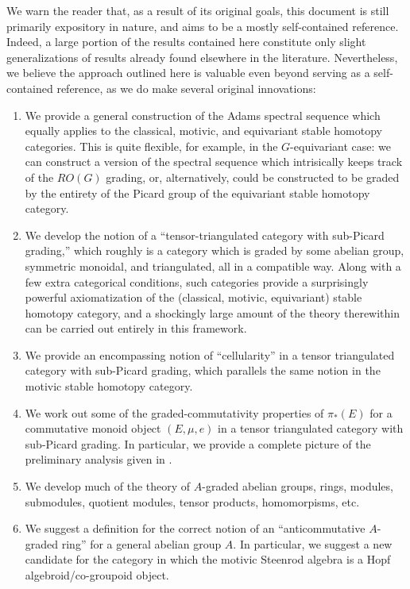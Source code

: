 \documentclass[../main.tex]{subfiles}
\begin{document}
We warn the reader that, as a result of its original goals, this document is still primarily expository in nature, and aims to be a mostly self-contained reference. Indeed, a large portion of the results contained here constitute only slight generalizations of results already found elsewhere in the literature. Nevertheless, we believe the approach outlined here is valuable even beyond serving as a self-contained reference, as we do make several original innovations:
\begin{enumerate}
    \item We provide a general construction of the Adams spectral sequence which equally applies to the classical, motivic, and equivariant stable homotopy categories. This is quite flexible, for example, in the $G$-equivariant case: we can construct a version of the spectral sequence which intrisically keeps track of the $RO(G)$ grading, or, alternatively, could be constructed to be graded by the entirety of the Picard group of the equivariant stable homotopy category.
    \item We develop the notion of a ``tensor-triangulated category with sub-Picard grading,'' which roughly is a category which is graded by some abelian group, symmetric monoidal, and triangulated, all in a compatible way. Along with a few extra categorical conditions, such categories provide a surprisingly powerful axiomatization of the (classical, motivic, equivariant) stable homotopy category, and a shockingly large amount of the theory therewithin can be carried out entirely in this framework.
    \item We provide an encompassing notion of ``cellularity'' in a tensor triangulated category with sub-Picard grading, which parallels the same notion in the motivic stable homotopy category.
    \item We work out some of the graded-commutativity properties of $\pi_*(E)$ for a commutative monoid object $(E,\mu,e)$ in a tensor triangulated category with sub-Picard grading. In particular, we provide a complete picture of the preliminary analysis given in \cite[Remark 7.2]{Dugger_2014}.
    \item We develop much of the theory of $A$-graded abelian groups, rings, modules, submodules, quotient modules, tensor products, homomorpisms, etc.
    \item We suggest a definition for the correct notion of an ``anticommutative $A$-graded ring'' for a general abelian group $A$. In particular, we suggest a new candidate for the category in which the motivic Steenrod algebra is a Hopf algebroid/co-groupoid object.
\end{enumerate}
\end{document}
